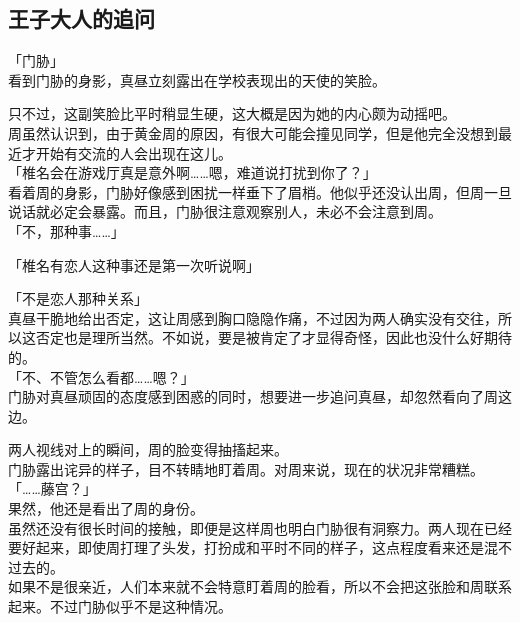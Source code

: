 \subsection{王子大人的追问}

「门胁」\\

看到门胁的身影，真昼立刻露出在学校表现出的天使的笑脸。

只不过，这副笑脸比平时稍显生硬，这大概是因为她的内心颇为动摇吧。\\

周虽然认识到，由于黄金周的原因，有很大可能会撞见同学，但是他完全没想到最近才开始有交流的人会出现在这儿。\\

「椎名会在游戏厅真是意外啊……嗯，难道说打扰到你了？」\\

看着周的身影，门胁好像感到困扰一样垂下了眉梢。他似乎还没认出周，但周一旦说话就必定会暴露。而且，门胁很注意观察别人，未必不会注意到周。\\

「不，那种事……」

「椎名有恋人这种事还是第一次听说啊」

「不是恋人那种关系」\\

真昼干脆地给出否定，这让周感到胸口隐隐作痛，不过因为两人确实没有交往，所以这否定也是理所当然。不如说，要是被肯定了才显得奇怪，因此也没什么好期待的。\\

「不、不管怎么看都……嗯？」\\

门胁对真昼顽固的态度感到困惑的同时，想要进一步追问真昼，却忽然看向了周这边。

两人视线对上的瞬间，周的脸变得抽搐起来。\\

门胁露出诧异的样子，目不转睛地盯着周。对周来说，现在的状况非常糟糕。\\

「……藤宫？」\\

果然，他还是看出了周的身份。\\

虽然还没有很长时间的接触，即便是这样周也明白门胁很有洞察力。两人现在已经要好起来，即使周打理了头发，打扮成和平时不同的样子，这点程度看来还是混不过去的。\\

如果不是很亲近，人们本来就不会特意盯着周的脸看，所以不会把这张脸和周联系起来。不过门胁似乎不是这种情况。\\

